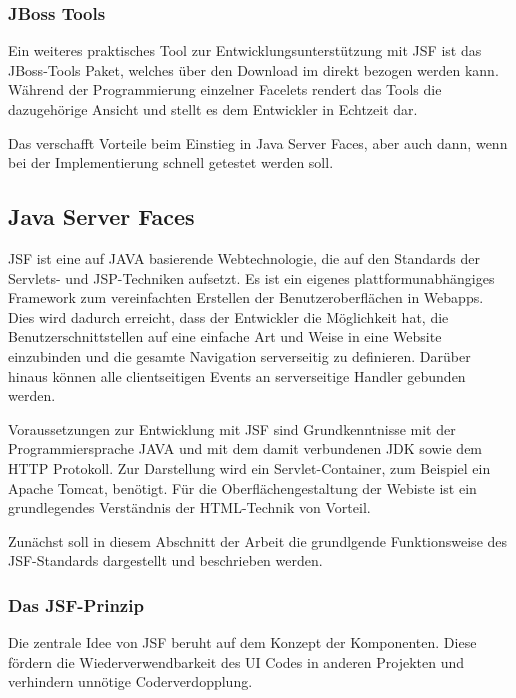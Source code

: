 \subsubsection{JBoss Tools}
Ein weiteres praktisches Tool zur Entwicklungsunterstützung mit \ac{JSF} ist das JBoss-Tools Paket, welches über den Download im  direkt bezogen werden kann.
Während der Programmierung einzelner Facelets rendert das Tools die dazugehörige Ansicht und stellt es dem Entwickler in Echtzeit dar. 

Das verschafft Vorteile beim Einstieg in Java Server Faces, aber auch dann, wenn bei der Implementierung schnell getestet werden soll.

\subsection{Java Server Faces}

JSF ist eine auf JAVA basierende Webtechnologie, die auf den Standards der Servlets- und JSP-Techniken aufsetzt.
Es ist ein eigenes plattformunabhängiges Framework zum vereinfachten Erstellen der Benutzeroberflächen in Webapps.
Dies wird dadurch erreicht, dass der Entwickler die Möglichkeit hat, die Benutzerschnittstellen auf eine einfache Art und Weise in eine Website einzubinden und die gesamte Navigation serverseitig zu definieren.
Darüber hinaus können alle clientseitigen Events an serverseitige Handler gebunden werden. 

Voraussetzungen zur Entwicklung mit JSF sind Grundkenntnisse mit der Programmiersprache JAVA und mit dem damit verbundenen \gls{JDK} sowie dem \gls{HTTP} Protokoll.
Zur Darstellung wird ein Servlet-Container, zum Beispiel ein Apache Tomcat, benötigt.
Für die Oberflächengestaltung der Webiste ist ein grundlegendes Verständnis der HTML-Technik von Vorteil.

Zunächst soll in diesem Abschnitt der Arbeit die grundlgende Funktionsweise des JSF-Standards dargestellt und beschrieben werden. 

\subsubsection{Das JSF-Prinzip}


Die zentrale Idee von JSF beruht auf dem Konzept der Komponenten. Diese fördern die Wiederverwendbarkeit des UI Codes in anderen Projekten und verhindern unnötige Coderverdopplung.



